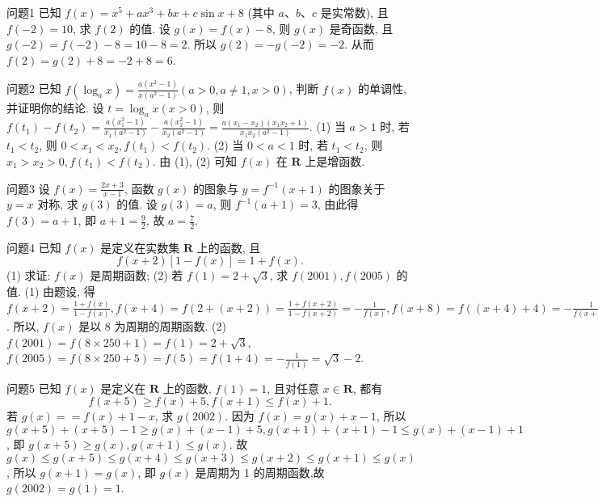 
问题1 已知 $f(x)=x^5+a x^3+b x+c \sin x+8$ (其中 $a 、 b 、 c$ 是实常数), 且 $f(-2)=10$, 求 $f(2)$ 的值.
设 $g(x)=f(x)-8$, 则 $g(x)$ 是奇函数, 且 $g(-2)=f(-2)-8=10- 8=2$. 所以 $g(2)=-g(-2)=-2$. 从而 $f(2)=g(2)+8=-2+8=6$.



问题2 已知 $f\left(\log _a x\right)=\frac{a\left(x^2-1\right)}{x\left(a^2-1\right)}(a>0, a \neq 1, x>0)$, 判断 $f(x)$ 的单调性, 并证明你的结论.
设 $t=\log _a x(x>0)$, 则 $f\left(t_1\right)-f\left(t_2\right)=\frac{a\left(x_1^2-1\right)}{x_1\left(a^2-1\right)}-\frac{a\left(x_2^2-1\right)}{x_2\left(a^2-1\right)}= \frac{a\left(x_1-x_2\right)\left(x_1 x_2+1\right)}{x_1 x_2\left(a^2-1\right)}$.
(1) 当 $a>1$ 时, 若 $t_1<t_2$, 则 $0<x_1<x_2, f\left(t_1\right)<f\left(t_2\right)$.
(2) 当 $0<a<1$ 时, 若 $t_1<t_2$, 则 $x_1>x_2>0, f\left(t_1\right)<f\left(t_2\right)$. 
由 (1), (2) 可知 $f(x)$ 在 $\mathbf{R}$ 上是增函数.



问题3 设 $f(x)=\frac{2 x+3}{x-1}$, 函数 $g(x)$ 的图象与 $y=f^{-1}(x+1)$ 的图象关于 $y= x$ 对称, 求 $g(3)$ 的值.
设 $g(3)=a$, 则 $f^{-1}(a+1)=3$, 由此得 $f(3)=a+1$, 即 $a+1=\frac{9}{2}$, 故 $a=\frac{7}{2}$.



问题4 已知 $f(x)$ 是定义在实数集 $\mathbf{R}$ 上的函数, 且
$$
f(x+2)[1-f(x)]=1+f(x) .
$$
(1) 求证: $f(x)$ 是周期函数;
(2) 若 $f(1)=2+\sqrt{3}$, 求 $f(2001), f(2005)$ 的值.
(1) 由题设, 得 $f(x+2)=\frac{1+f(x)}{1-f(x)}, f(x+4)=f(2+(x+2))= \frac{1+f(x+2)}{1-f(x+2)}=-\frac{1}{f(x)}, f(x+8)=f((x+4)+4)=-\frac{1}{f(x+4)}=f(x)$. 
所以, $f(x)$ 是以 8 为周期的周期函数.
(2) $f(2001)=f(8 \times 250+1)= f(1)=2+\sqrt{3}$, 
$f(2005)=f(8 \times 250+5)=f(5)=f(1+4)=-\frac{1}{f(1)}= \sqrt{3}-2$.



问题5 已知 $f(x)$ 是定义在 $\mathbf{R}$ 上的函数, $f(1)=1$, 且对任意 $x \in \mathbf{R}$, 都有
$$
f(x+5) \geqslant f(x)+5, f(x+1) \leqslant f(x)+1 .
$$
若 $g(x)==f(x)+1-x$, 求 $g(2002)$. 
因为 $f(x)=g(x)+x-1$, 所以 $g(x+5)+(x+5)-1 \geqslant g(x)+ (x-1)+5, g(x+1)+(x+1)-1 \leqslant g(x)+(x-1)+1$, 即 $g(x+5) \geqslant g(x), g(x+1) \leqslant g(x)$. 
故 $g(x) \leqslant g(x+5) \leqslant g(x+4) \leqslant g(x+3) \leqslant g(x+2) \leqslant g(x+1) \leqslant g(x)$, 所以 $g(x+1)=g(x)$, 即 $g(x)$ 是周期为 1 的周期函数,故 $g(2002)=g(1)=1$.



